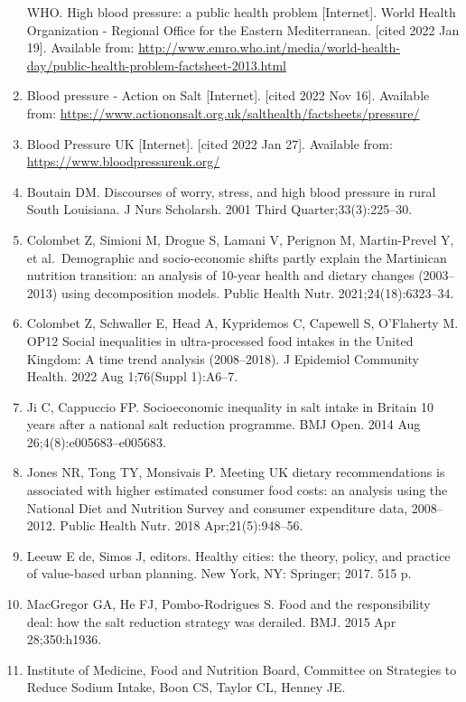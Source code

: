 \documentclass[
]{article}
\begin{document}
\begin{enumerate}
  WHO. High blood pressure: a public health problem {[}Internet{]}.
  World Health Organization - Regional Office for the Eastern
  Mediterranean. {[}cited 2022 Jan 19{]}. Available from:
  \url{http://www.emro.who.int/media/world-health-day/public-health-problem-factsheet-2013.html}
\item
  Blood pressure - Action on Salt {[}Internet{]}. {[}cited 2022 Nov
  16{]}. Available from:
  \url{https://www.actiononsalt.org.uk/salthealth/factsheets/pressure/}
\item
  Blood Pressure UK {[}Internet{]}. {[}cited 2022 Jan 27{]}. Available
  from: \url{https://www.bloodpressureuk.org/}
\item
  Boutain DM. Discourses of worry, stress, and high blood pressure in
  rural South Louisiana. J Nurs Scholarsh. 2001 Third
  Quarter;33(3):225--30.
\item
  Colombet Z, Simioni M, Drogue S, Lamani V, Perignon M, Martin-Prevel
  Y, et al.~Demographic and socio-economic shifts partly explain the
  Martinican nutrition transition: an analysis of 10-year health and
  dietary changes (2003--2013) using decomposition models. Public Health
  Nutr. 2021;24(18):6323--34.
\item
  Colombet Z, Schwaller E, Head A, Kypridemos C, Capewell S, O'Flaherty
  M. OP12 Social inequalities in ultra-processed food intakes in the
  United Kingdom: A time trend analysis (2008--2018). J Epidemiol
  Community Health. 2022 Aug 1;76(Suppl 1):A6--7.
\item
  Ji C, Cappuccio FP. Socioeconomic inequality in salt intake in Britain
  10 years after a national salt reduction programme. BMJ Open. 2014 Aug
  26;4(8):e005683--e005683.
\item
  Jones NR, Tong TY, Monsivais P. Meeting UK dietary recommendations is
  associated with higher estimated consumer food costs: an analysis
  using the National Diet and Nutrition Survey and consumer expenditure
  data, 2008--2012. Public Health Nutr. 2018 Apr;21(5):948--56.
\item
  Leeuw E de, Simos J, editors. Healthy cities: the theory, policy, and
  practice of value-based urban planning. New York, NY: Springer; 2017.
  515 p.~
\item
  MacGregor GA, He FJ, Pombo-Rodrigues S. Food and the responsibility
  deal: how the salt reduction strategy was derailed. BMJ. 2015 Apr
  28;350:h1936.
\item
  Institute of Medicine, Food and Nutrition Board, Committee on
  Strategies to Reduce Sodium Intake, Boon CS, Taylor CL, Henney JE.

\end{enumerate}
\end{document}
